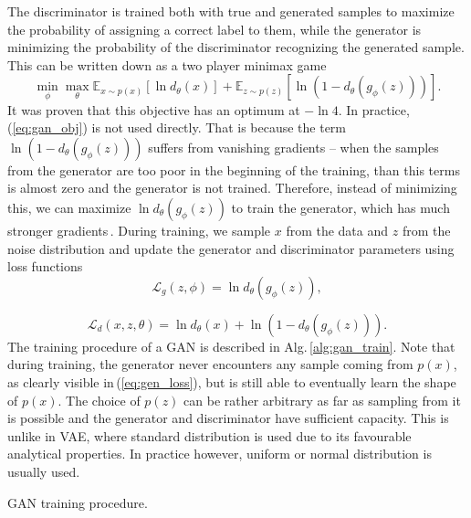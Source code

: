 The discriminator is trained both with true and generated samples
to maximize the probability of assigning a correct label to them,
while the generator is minimizing the probability of the discriminator
recognizing the generated sample. This can be written down as a two
player minimax game 
\begin{equation}
\min_{\phi}\max_{\theta}\mathbb{E}_{x\sim p(x)}\left[\ln d_{\theta}(x)\right]+\mathbb{E}_{z\sim p(z)}\left[\ln\left(1-d_{\theta}(g_{\phi}(z))\right)\right].\label{eq:gan_obj}
\end{equation}
It was proven that this objective has an optimum at $-\ln4$. In practice,
(\ref{eq:gan_obj}) is not used directly. That is because the term
$\ln\left(1-d_{\theta}(g_{\phi}(z))\right)$ suffers from vanishing
gradients -- when the samples from the generator are too poor in
the beginning of the training, than this terms is almost zero and
the generator is not trained. Therefore, instead of minimizing this,
we can maximize $\ln d_{\theta}(g_{\phi}(z))$ to train the generator,
which has much stronger gradients\,\cite{goodfellow2014gan}. During
training, we sample $x$ from the data and $z$ from the noise distribution
and update the generator and discriminator parameters using loss functions
\begin{equation}
\mathcal{L}_{g}(z,\phi)=\ln d_{\theta}(g_{\phi}(z)),\label{eq:gen_loss}
\end{equation}

\begin{equation}
\mathcal{L}_{d}(x,z,\theta)=\ln d_{\theta}(x)+\ln\left(1-d_{\theta}(g_{\phi}(z))\right).\label{eq:disc_loss}
\end{equation}
The training procedure of a GAN is described in Alg.\,\ref{alg:gan_train}.
Note that during training, the generator never encounters any sample
coming from $p(x)$, as clearly visible in\,(\ref{eq:gen_loss}),
but is still able to eventually learn the shape of $p(x)$. The choice
of $p(z)$ can be rather arbitrary as far as sampling from it is possible
and the generator and discriminator have sufficient capacity. This
is unlike in VAE, where standard distribution is used due to its favourable
analytical properties. In practice however, uniform or normal distribution
is usually used.

\begin{algorithm}


\caption{GAN training procedure.}
\label{alg:gan_train}

\end{algorithm}

